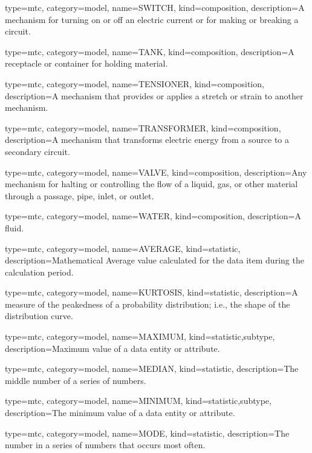{
  type=mtc,
  category=model,
  name={SWITCH},
  kind={composition},
  description={A mechanism for turning on or off an electric current or for making or breaking a circuit.}
}


{
  type=mtc,
  category=model,
  name={TANK},
  kind={composition},
  description={A receptacle or container for holding material.}
}


{
  type=mtc,
  category=model,
  name={TENSIONER},
  kind={composition},
  description={A mechanism that provides or applies a stretch or strain to another mechanism.}
}


{
  type=mtc,
  category=model,
  name={TRANSFORMER},
  kind={composition},
  description={A mechanism that transforms electric energy from a source to a secondary circuit.}
}


{
  type=mtc,
  category=model,
  name={VALVE},
  kind={composition},
  description={Any mechanism for halting or controlling the flow of a liquid, gas, or other material through a passage, pipe, inlet, or outlet.}
}


{
  type=mtc,
  category=model,
  name={WATER},
  kind={composition},
  description={A fluid.}
}


{
  type=mtc,
  category=model,
  name={AVERAGE},
  kind={statistic},
  description={Mathematical Average value calculated for the data item during the calculation period.}
}


{
  type=mtc,
  category=model,
  name={KURTOSIS},
  kind={statistic},
  description={A measure of the peakedness of a probability distribution; i.e., the shape of the distribution curve.}
}


{
  type=mtc,
  category=model,
  name={MAXIMUM},
  kind={statistic,subtype},
  description={Maximum value of a data entity or attribute.}
}


{
  type=mtc,
  category=model,
  name={MEDIAN},
  kind={statistic},
  description={The middle number of a series of numbers.}
}


{
  type=mtc,
  category=model,
  name={MINIMUM},
  kind={statistic,subtype},
  description={The minimum value of a data entity or attribute.}
}


{
  type=mtc,
  category=model,
  name={MODE},
  kind={statistic},
  description={The number in a series of numbers that occurs most often.}
}


